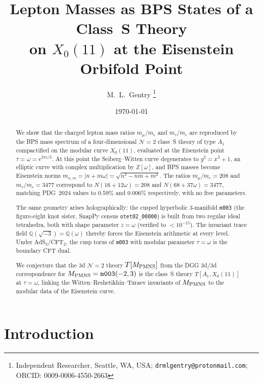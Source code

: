 \documentclass[11pt,a4paper]{article}
\theoremstyle{remark}
\newcommand{\mfld}[1]{\texttt{#1}}
\newcommand{\Z}{\mathbb{Z}}
\newcommand{\Q}{\mathbb{Q}}
\begin{document}
\title{Lepton Masses as BPS States of a Class~S Theory\\
on $X_0(11)$ at the Eisenstein Orbifold Point}

\author{M.~L.~Gentry%
\thanks{Independent Researcher, Seattle, WA, USA;
\texttt{drmlgentry@protonmail.com};
ORCID: 0009-0006-4550-2663}}
\date{\today}
\maketitle

\begin{abstract}
We show that the charged lepton mass ratios $m_\mu/m_e$ and $m_\tau/m_e$
are reproduced by the BPS mass spectrum of a four-dimensional
$\mathcal{N}=2$ class~S theory of type $A_1$ compactified on the modular
curve $X_0(11)$, evaluated at the Eisenstein point $\tau=\omega=e^{2\pi i/3}$.
At this point the Seiberg--Witten curve degenerates to $y^2=x^3+1$,
an elliptic curve with complex multiplication by $\Z[\omega]$, and
BPS masses become Eisenstein norms
$m_{n,m}=|n+m\omega|=\sqrt{n^2-nm+m^2}$.
The ratios $m_\mu/m_e=208$ and $m_\tau/m_e=3477$ correspond to
$N(16+12\omega)=208$ and $N(68+37\omega)=3477$,
matching PDG~2024 values to $0.59\%$ and $0.006\%$ respectively,
with no free parameters.

The same geometry arises holographically: the cusped hyperbolic
3-manifold \mfld{m003} (the figure-eight knot sister, SnapPy census
\texttt{otet02\_00000}) is built from two regular ideal tetrahedra,
both with shape parameter $z=\omega$ (verified to $<10^{-15}$).
The invariant trace field $\Q(\sqrt{-3})=\Q(\omega)$ thereby forces the
Eisenstein arithmetic at every level.
Under AdS$_3$/CFT$_2$, the cusp torus of \mfld{m003} with modular
parameter $\tau=\omega$ is the boundary CFT dual.

We conjecture that the 3d $\mathcal{N}=2$ theory $T[M_{\rm PMNS}]$
from the DGG 3d/3d correspondence for $M_{\rm PMNS}=\mfld{m003}(-2,3)$
is the class~S theory $T[A_1,X_0(11)]$ at $\tau=\omega$,
linking the Witten--Reshetikhin--Turaev invariants of $M_{\rm PMNS}$
to the modular data of the Eisenstein curve.
\end{abstract}

\section{Introduction}
\end{document}
